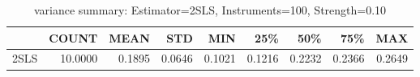 \begin{table}[ht]
\centering
\caption{variance summary: Estimator=2SLS, Instruments=100, Strength=0.10}
\begin{tabular}{lrrrrrrrr}
\toprule
 & COUNT & MEAN & STD & MIN & 25\% & 50\% & 75\% & MAX \\
\midrule
2SLS & 10.0000 & 0.1895 & 0.0646 & 0.1021 & 0.1216 & 0.2232 & 0.2366 & 0.2649 \\
\bottomrule
\end{tabular}
\end{table}
